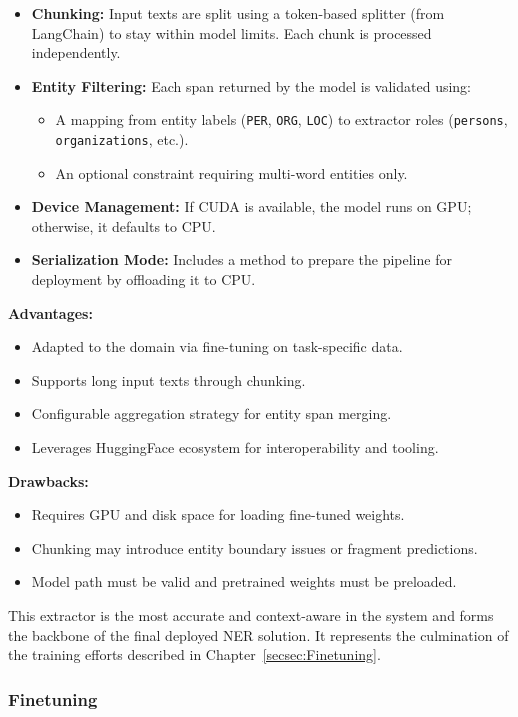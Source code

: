 \begin{itemize}
  \item \textbf{Chunking:} Input texts are split using a token-based splitter (from LangChain) to stay within model limits. Each chunk is processed independently.
  \item \textbf{Entity Filtering:} Each span returned by the model is validated using:
    \begin{itemize}
      \item A mapping from entity labels (\texttt{PER}, \texttt{ORG}, \texttt{LOC}) to extractor roles (\texttt{persons}, \texttt{organizations}, etc.).
      \item An optional constraint requiring multi-word entities only.
    \end{itemize}
  \item \textbf{Device Management:} If CUDA is available, the model runs on GPU; otherwise, it defaults to CPU.
  \item \textbf{Serialization Mode:} Includes a method to prepare the pipeline for deployment by offloading it to CPU.
\end{itemize}

\textbf{Advantages:}
\begin{itemize}
  \item Adapted to the domain via fine-tuning on task-specific data.
  \item Supports long input texts through chunking.
  \item Configurable aggregation strategy for entity span merging.
  \item Leverages HuggingFace ecosystem for interoperability and tooling.
\end{itemize}

\textbf{Drawbacks:}
\begin{itemize}
  \item Requires GPU and disk space for loading fine-tuned weights.
  \item Chunking may introduce entity boundary issues or fragment predictions.
  \item Model path must be valid and pretrained weights must be preloaded.
\end{itemize}

This extractor is the most accurate and context-aware in the system and forms the backbone of the final deployed NER solution. It represents the culmination of the training efforts described in Chapter~\ref{secsec:Finetuning}.

\subsubsection{Finetuning}


